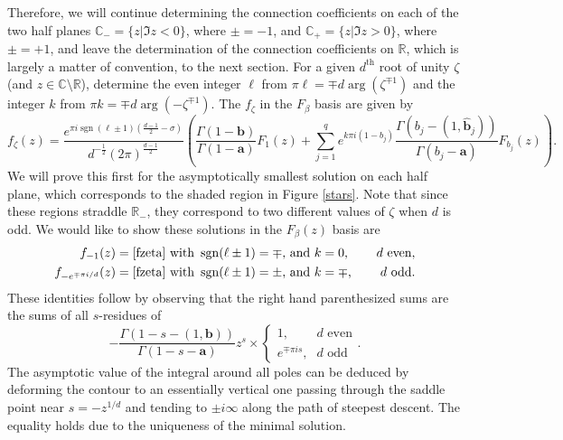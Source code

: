 \documentclass[12pt]{article}
\newcommand{\ee}[0] {e}
\newcommand{\ii}[0] {i}
\numberwithin{equation}{section}
\newcommand{\bfa}[0] {\mathbf{a}}
\newcommand{\bfb}[0] {\mathbf{b}}
\begin{document}
Therefore, we will continue determining the connection coefficients on each of the two half planes $\mathbb{C}_{-} = \{z |\Im z < 0\}$, where $\pm=-1$, and $\mathbb{C}_{+} = \{z |\Im z > 0\}$, where $\pm=+1$,
and leave the determination of the connection coefficients on $\mathbb{R}$, which is largely a matter of convention, to the next section. For a given $d^{\text{th}}$ root of unity $\zeta$ (and $z \in \mathbb{C} \setminus \mathbb{R}$), determine the even integer $\ell$ from $\pi \ell =\mp d \arg(\zeta^{\mp1})$ and the integer $k$ from $\pi k =\mp d \arg(-\zeta^{\mp1})$. The $f_{\zeta}$ in the $F_{\beta}$ basis are given by
\begin{equation}
\label{fzeta}
f_{\zeta}(z) = \frac{\ee^{\pi \ii \operatorname{sgn}(\ell \pm 1) (\frac{d-1}{2}-\sigma)}}{d^{-\frac{1}{2}}(2\pi)^{\frac{d-1}{2}}} \left(\frac{\Gamma(1-\bfb)}{\Gamma(1-\bfa)} F_1(z) + \sum_{j=1}^{q} \ee^{k \pi i (1-b_j)}\frac{\Gamma(b_j - (1,\hat{\bfb}_j))}{\Gamma(b_j-\bfa)} F_{b_j}(z) \right) \text{.}
\end{equation}
We will prove this first for the asymptotically smallest solution on each half plane, which corresponds to the shaded region in Figure \ref{stars}. Note that since these regions straddle $\mathbb{R}_{-}$, they correspond to two different values of $\zeta$ when $d$ is odd. We would like to show these solutions in the $F_{\beta}(z)$ basis are
\begin{align*}
f_{-1}(z) &= \eqref{fzeta} \text{ with } \operatorname{sgn}(\ell \pm 1) = \mp\text{, and } k = 0\text{,} \quad & d \text{ even}\text{,}\\
f_{-\ee^{\mp\pi i/d}}(z) &= \eqref{fzeta} \text{ with } \operatorname{sgn}(\ell \pm 1) = \pm\text{, and } k = \mp \text{,} \quad & d \text{ odd}\text{.}
\end{align*}
These identities follow by observing that the right hand parenthesized sums are the sums of all $s$-residues of
\begin{equation*}
-\frac{\Gamma(1-s-(1,\bfb))}{\Gamma(1-s-\bfa)} z^s \times \begin{cases}
1\text{,} & d \text{ even}\\
\ee^{\mp \pi i s}\text{,} & d \text{ odd}
\end{cases}\text{.}
\end{equation*}
The asymptotic value of the integral around all poles can be deduced by deforming the contour to an essentially vertical one passing through the saddle point near $s=-z^{1/d}$ and tending to $\pm i \infty$ along the path of steepest descent. The equality holds due to the uniqueness of the minimal solution.
\end{document}
